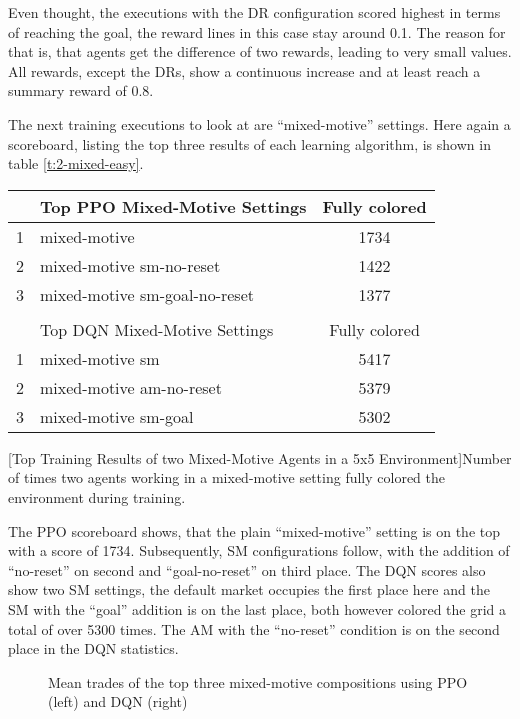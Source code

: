 Even thought, the executions with the DR configuration scored highest in terms of reaching the goal, the reward lines in this case stay around 0.1. The reason for that is, that agents get the difference of two rewards, leading to very small values. All rewards, except the DRs, show a continuous increase and at least reach a summary reward of 0.8. 

The next training executions to look at are ``mixed-motive'' settings. Here again a scoreboard, listing the top three results of each learning algorithm, is shown in table \ref{t:2-mixed-easy}.
\begin{center}
    \begin{tabular}{clc}\hline
         & Top PPO Mixed-Motive Settings & Fully colored \\ \hline
        {\small 1} & mixed-motive & 1734 \\
        {\small 2} & mixed-motive sm-no-reset & 1422 \\
        {\small 3} & mixed-motive sm-goal-no-reset & 1377 \\ \hline
         &   \\ \hline
         & Top DQN Mixed-Motive Settings & Fully colored \\ \hline
        {\small 1} & mixed-motive sm & 5417 \\
        {\small 2} & mixed-motive am-no-reset & 5379 \\
        {\small 3} & mixed-motive sm-goal & 5302 \\ \hline
        \end{tabular}
        [Top Training Results of two Mixed-Motive Agents in a 5x5 Environment]{Number of times two agents working in a mixed-motive setting fully colored the environment during training.}\label{t:2-mixed-easy}
    \end{center}

The PPO scoreboard shows, that the plain ``mixed-motive'' setting is on the top with a score of 1734. Subsequently, SM configurations follow, with the addition of ``no-reset'' on second and ``goal-no-reset'' on third place. The DQN scores also show two SM settings, the default market occupies the first place here and the SM with the ``goal'' addition is on the last place, both however colored the grid a total of over 5300 times. The AM with the ``no-reset'' condition is on the second place in the DQN statistics.

\begin{figure}[hpbt]
    \centering
    \hspace{0.01\textwidth}
    \caption[Mean Trades of the Top Mixed-Motive Modes in a 5x5 Environment]{Mean trades of the top three mixed-motive compositions using PPO (left) and DQN (right)}
    \label{fig:multipic_plots_mixed_easy}
\end{figure}

